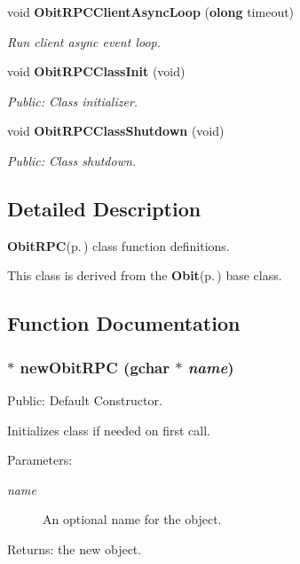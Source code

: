 \begin{CompactItemize}
void {\bf Obit\-RPCClient\-Async\-Loop} ({\bf olong} timeout)
\begin{CompactList}\small\item\em Run client async event loop. \item\end{CompactList}\item 
void {\bf Obit\-RPCClass\-Init} (void)
\begin{CompactList}\small\item\em Public: Class initializer. \item\end{CompactList}\item 
void {\bf Obit\-RPCClass\-Shutdown} (void)
\begin{CompactList}\small\item\em Public: Class shutdown. \item\end{CompactList}\end{CompactItemize}


\subsection{Detailed Description}
{\bf Obit\-RPC}{\rm (p.\,\pageref{structObitRPC})} class function definitions. 

This class is derived from the {\bf Obit}{\rm (p.\,\pageref{structObit})} base class.

\subsection{Function Documentation}
\subsubsection{$\ast$ new\-Obit\-RPC (gchar $\ast$ {\em name})}\label{ObitRPC_8c_a7}


Public: Default Constructor. 

Initializes class if needed on first call. \begin{Desc}
\item[Parameters:]
\begin{description}
\item[{\em name}]An optional name for the object. \end{description}
\end{Desc}
\begin{Desc}
\item[Returns:]the new object. \end{Desc}
